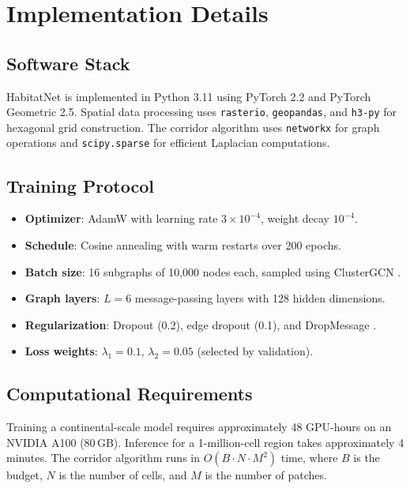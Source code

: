 \section{Implementation Details}

\label{sec:implementation}

\subsection{Software Stack}

HabitatNet is implemented in Python 3.11 using PyTorch 2.2 and PyTorch
Geometric 2.5. Spatial data processing uses \texttt{rasterio},
\texttt{geopandas}, and \texttt{h3-py} for hexagonal grid construction.
The corridor algorithm uses \texttt{networkx} for graph operations and
\texttt{scipy.sparse} for efficient Laplacian computations.

\subsection{Training Protocol}

\begin{itemize}
  \item \textbf{Optimizer}: AdamW with learning rate $3 \times 10^{-4}$,
    weight decay $10^{-4}$.
  \item \textbf{Schedule}: Cosine annealing with warm restarts over 200
    epochs.
  \item \textbf{Batch size}: 16 subgraphs of 10{,}000 nodes each,
    sampled using ClusterGCN \citep{chiang2019cluster}.
  \item \textbf{Graph layers}: $L = 6$ message-passing layers with 128
    hidden dimensions.
  \item \textbf{Regularization}: Dropout (0.2), edge dropout (0.1),
    and DropMessage \citep{fang2023dropmessage}.
  \item \textbf{Loss weights}: $\lambda_1 = 0.1$, $\lambda_2 = 0.05$
    (selected by validation).
\end{itemize}

\subsection{Computational Requirements}

Training a continental-scale model requires approximately 48 GPU-hours on
an NVIDIA A100 (80\,GB). Inference for a 1-million-cell region takes
approximately 4 minutes. The corridor algorithm runs in $O(B \cdot N
\cdot M^2)$ time, where $B$ is the budget, $N$ is the number of cells,
and $M$ is the number of patches.


